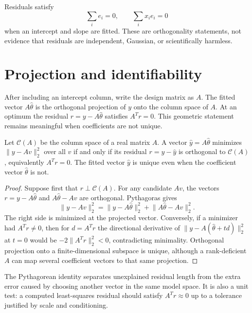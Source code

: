 Residuals satisfy
\[
\sum_i e_i=0,
\qquad
\sum_i x_ie_i=0
\]
when an intercept and slope are fitted. These are orthogonality statements, not
evidence that residuals are independent, Gaussian, or scientifically harmless.


\section{Projection and identifiability}

After including an intercept column, write the design matrix as $A$. The fitted
vector $A\widehat\theta$ is the orthogonal projection of $y$ onto the column
space of $A$. At an optimum the residual $r=y-A\widehat\theta$ satisfies
$A^Tr=0$. This geometric statement remains meaningful when coefficients are
not unique.

\begin{theorem}
\label{thm:least-squares-projection}
Let $\mathcal C(A)$ be the column space of a real matrix $A$. A vector
$\widehat y=A\widehat\theta$ minimizes $\lVert y-Av\rVert_2^2$ over all $v$
if and only if its residual $r=y-\widehat y$ is orthogonal to
$\mathcal C(A)$, equivalently $A^Tr=0$. The fitted vector $\widehat y$ is
unique even when the coefficient vector $\widehat\theta$ is not.
\end{theorem}

\begin{proof}
Suppose first that $r\perp\mathcal C(A)$. For any candidate $Av$, the vectors
$r=y-A\widehat\theta$ and $A\widehat\theta-Av$ are orthogonal. Pythagoras gives
\[
\lVert y-Av\rVert_2^2
=\lVert y-A\widehat\theta\rVert_2^2
+\lVert A\widehat\theta-Av\rVert_2^2.
\]
The right side is minimized at the projected vector. Conversely, if a
minimizer had $A^Tr\ne0$, then for $d=A^Tr$ the directional derivative of
$\lVert y-A(\widehat\theta+td)\rVert_2^2$ at $t=0$ would be
$-2\lVert A^Tr\rVert_2^2<0$, contradicting minimality. Orthogonal projection
onto a finite-dimensional subspace is unique, although a rank-deficient $A$
can map several coefficient vectors to that same projection.
\end{proof}

The Pythagorean identity separates unexplained residual length from the extra
error caused by choosing another vector in the same model space. It is also a
unit test: a computed least-squares residual should satisfy $A^Tr\approx0$ up
to a tolerance justified by scale and conditioning.

